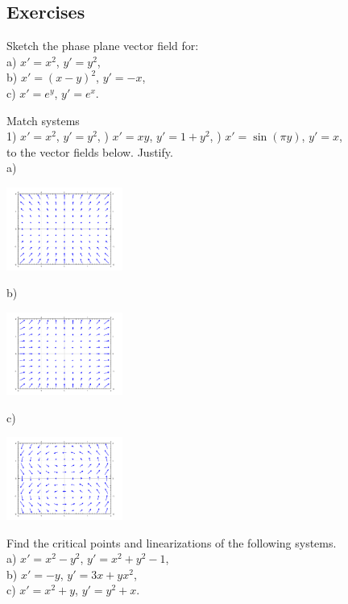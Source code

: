 \subsection{Exercises}

\begin{exercise}
Sketch the phase plane vector field for:\\
a) $x'=x^2$, $y'=y^2$,\\
b) $x'=(x-y)^2$, $y'=-x$,\\
c) $x'=e^y$, $y'=e^x$.
\end{exercise}

\begin{exercise}
Match systems\\
1) $x'=x^2$, $y'=y^2$,
) $x'=xy$, $y'=1+y^2$,
) $x'=\sin(\pi y)$, $y'=x$,
\\
to the vector fields below.  Justify.
\\
a)
\parbox[c]{1.6in}{\includegraphics[width=1.5in]{figures/nlin-exer-xy-1py2}}
b)
\parbox[c]{1.6in}{\includegraphics[width=1.5in]{figures/nlin-exer-x2-y2}}
c)
\parbox[c]{1.6in}{\includegraphics[width=1.5in]{figures/nlin-exer-sinpiy-x}}
\end{exercise}


\begin{exercise}
Find the critical points and linearizations of the following systems.\\
a) $x'=x^2-y^2$, $y'=x^2+y^2-1$,\\
b) $x'=-y$, $y'=3x+yx^2$,\\
c) $x'=x^2+y$, $y'=y^2+x$.
\end{exercise}

